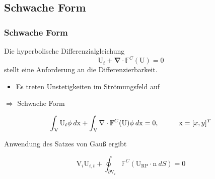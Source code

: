 \documentclass[
	11pt, %
	aspectratio=169, %
]{beamer}
\begin{document}

\subsection{Schwache Form}

\begin{frame}

	\frametitle{Schwache Form}

	Die hyperbolische Differenzialgleichung
	\begin{equation}
		\mathrm{U}_t + \mathbf{\nabla} \cdot \mathbb{F}^C (\mathrm{U}) = 0
	\end{equation}
	stellt eine Anforderung an die Differenzierbarkeit. 
	 \begin{itemize}
	 	\item Es treten Unstetigkeiten im Strömungsfeld auf
	 \end{itemize}
	
	\hspace*{1cm}$\Rightarrow$ Schwache Form

	\begin{equation}
		\int_\mathrm{V}{\mathrm{U}_t \phi \: d\mathrm{x}}+\int_{\mathrm{V}}{\nabla \cdot \mathbb{F}^C (\mathrm{U}) \phi \: d\mathrm{x} }=0, \hspace*{1cm} \mathrm{x} = [x,y]^T
	\end{equation}

	Anwendung des Satzes von Gauß ergibt

	\begin{equation}
		\mathrm{V}_i \mathrm{U}_{i,t} + \oint_{\partial \mathrm{V}_i}{\mathbb{F}^C (\mathrm{U_{RP}}\cdot \mathrm{n} \: dS)}=0
	\end{equation}



	
	
	

\end{frame}

\end{document}
